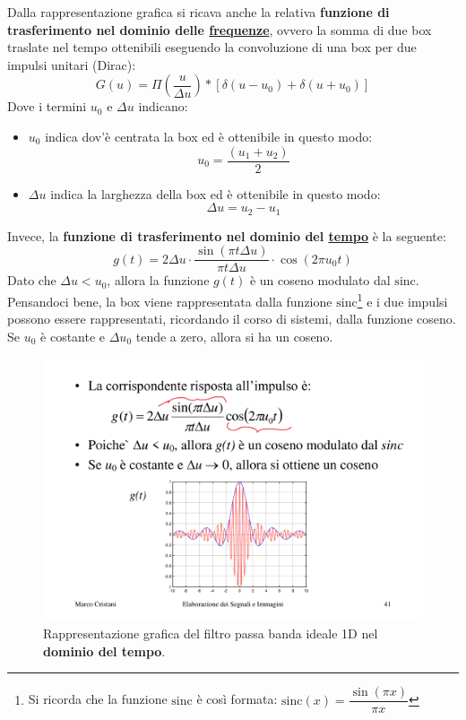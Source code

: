 \documentclass[a4paper]{article}
\begin{document}
	\noindent
	Dalla rappresentazione grafica si ricava anche la relativa \textbf{funzione di trasferimento nel dominio delle \underline{frequenze}}, ovvero la somma di due box traslate nel tempo ottenibili eseguendo la convoluzione di una box per due impulsi unitari (Dirac):
	\begin{equation*}
		G\left(u\right) = \Pi\left(\dfrac{u}{\Delta u}\right) * \left[\delta\left(u-u_{0}\right) + \delta\left(u+u_{0}\right)\right]
	\end{equation*}
	Dove i termini $u_{0}$ e $\Delta u$ indicano:
	\begin{itemize}
		\item $u_{0}$ indica dov'è centrata la box ed è ottenibile in questo modo:
		\begin{equation*}
			u_{0} = \dfrac{\left(u_{1} + u_{2}\right)}{2}
		\end{equation*}
		
		\item $\Delta u$ indica la larghezza della box ed è ottenibile in questo modo:
		\begin{equation*}
			\Delta u = u_{2} - u_{1}
		\end{equation*}
	\end{itemize}\newpage
	
	\noindent
	Invece, la \textbf{funzione di trasferimento nel dominio del \underline{tempo}} è la seguente:
	\begin{equation*}
		g\left(t\right) = 2\Delta u \cdot \dfrac{\sin\left(\pi t \Delta u\right)}{\pi t \Delta u} \cdot \cos\left(2 \pi u_{0} t\right)
	\end{equation*}
	Dato che $\Delta u < u_{0}$, allora la funzione $g\left(t\right)$ è un coseno modulato dal $\mathrm{sinc}$. Pensandoci bene, la box viene rappresentata dalla funzione $\mathrm{sinc}$\footnote{Si ricorda che la funzione $\mathrm{sinc}$ è così formata: $\mathrm{sinc}\left(x\right) = \dfrac{\sin\left(\pi x\right)}{\pi x}$} e i due impulsi possono essere rappresentati, ricordando il corso di sistemi, dalla funzione coseno. Se $u_{0}$ è costante e $\Delta u_{0}$ tende a zero, allora si ha un coseno.
	
	\begin{figure}[!htp]
		\centering
		\includegraphics[width=.7\textwidth]{img/filtro_passa_banda_ideale_grafico_tempo.pdf}
		\caption{Rappresentazione grafica del filtro passa banda ideale 1D nel \textbf{dominio del tempo}.}
	\end{figure}\newpage
	
\end{document}
